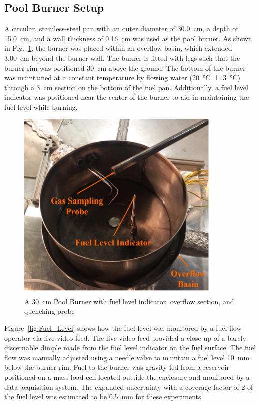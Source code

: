 \documentclass[12pt]{article}
\begin{document}
\subsection{Pool Burner Setup}
\label{ssec:Pool_Burner_Setup}
A circular, stainless-steel pan with an outer diameter of 30.0~\si{cm}, a depth of 15.0~\si{cm}, and a wall thickness of 0.16~\si{cm} was used as the pool burner. As shown in Fig.~\ref{fig:Pool Burner}, the burner was placed within an overflow basin, which extended 3.00~\si{cm} beyond the burner wall. The burner is fitted with legs such that the burner rim was positioned 30~\si{cm} above the ground. The bottom of the burner was maintained at a constant temperature by flowing water (20~°\si{C}~±~3~°\si{C}) through a 3~\si{cm} section on the bottom of the fuel pan. Additionally, a fuel level indicator was positioned near the center of the burner to aid in maintaining the fuel level while burning.

\begin{figure}[h!]
	\centering
\includegraphics[width=10.0cm,keepaspectratio]{Pool_Burner.png}
	\caption[Pool Burner Design]{A 30~\si{cm} Pool Burner with fuel level indicator, overflow section, and quenching probe}
	\label{fig:Pool Burner}
\end{figure}

Figure~\ref{fig:Fuel_Level} shows how the fuel level was monitored by a fuel flow operator via live video feed. The live video feed provided a close up of a barely discernable dimple made from the fuel level indicator on the fuel surface. The fuel flow was manually adjusted using a needle valve to maintain a fuel level 10~\si{mm} below the burner rim. Fuel to the burner was gravity fed from a reservoir positioned on a mass load cell located outside the enclosure and monitored by a data acquisition system. The expanded uncertainty with a coverage factor of 2 of the fuel level was estimated to be 0.5~\si{mm} for these experiments.
\end{document}
